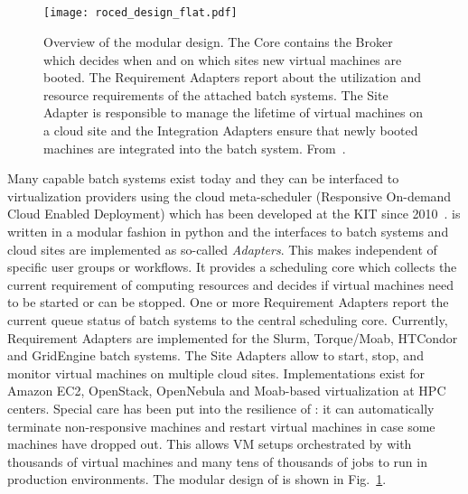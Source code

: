 \subsection{\Roced}
\begin{figure}
\begin{center}
  \texttt{[image: roced\_design\_flat.pdf]}
  \caption{Overview of the \Roced modular design. The  \Roced Core
    contains the Broker which decides when and on which sites new
    virtual machines are booted. The Requirement Adapters report about
    the utilization and resource requirements of the attached batch
    systems. The Site Adapter is responsible to manage the lifetime of
    virtual machines on a cloud site and the Integration Adapters
    ensure that newly booted machines are integrated into the batch
    system. From~\cite{ROCED}.}
  \label{fig-roced}
\end{center}
\end{figure}


Many capable batch systems exist today and they can be interfaced to virtualization providers using the cloud meta-scheduler \Roced (Responsive On-demand Cloud Enabled Deployment) which has been developed at the KIT since 2010~\cite{ROCED}. \Roced is written in a modular
fashion in python and the interfaces to batch systems and cloud sites
are implemented as so-called \textit{Adapters}. This makes \Roced
independent of specific user groups or workflows. It provides a
scheduling core which collects the current requirement of computing
resources and decides if virtual machines need to be started or can be
stopped. One or more Requirement Adapters report the current queue
status of batch systems to the central scheduling core. Currently,
Requirement Adapters are implemented for the Slurm, Torque/Moab, HTCondor
and GridEngine batch systems. The Site Adapters allow \Roced to start,
stop, and monitor virtual machines on multiple cloud
sites. Implementations exist for Amazon EC2, OpenStack, OpenNebula and
Moab-based virtualization at HPC centers. Special care has been put
into the resilience of \Roced: it can automatically terminate
non-responsive machines and restart virtual machines in case some
machines have dropped out. This allows VM setups orchestrated by \Roced with thousands of virtual machines and many tens of thousands of jobs to run in production environments.
The modular design of \Roced is shown in Fig.~\ref{fig-roced}.

